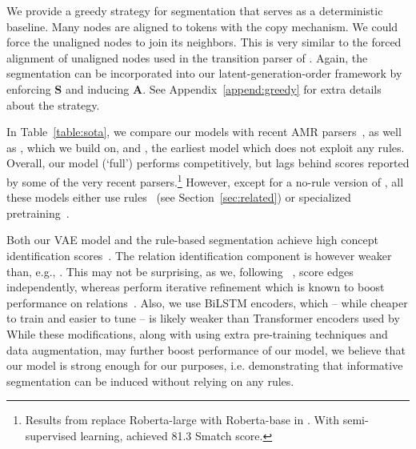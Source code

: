 \documentclass[11pt]{article}
\begin{document}
\vspace{1ex}
  \quad
We provide a greedy strategy for segmentation that serves as a deterministic baseline. Many nodes are aligned to tokens with the copy mechanism. We could force the unaligned nodes to join its neighbors. This is very similar to the forced alignment of unaligned nodes used in the transition parser of . Again, the segmentation can be  incorporated into our  latent-generation-order framework by enforcing $\mathbf{S}$ and inducing $\mathbf{A}$.
See Appendix~\ref{append:greedy} for extra details about the strategy.


\vspace{1ex}
   \quad
In Table~\ref{table:sota}, we compare our models with recent AMR parsers~\cite{xu-etal-2020-improving,Cai2020AMRPV,cai-lam-2019-core,Zhang2019AMRPA,Naseem2019RewardingST,Lindemann2020FastSP,Lee2020PushingTL}, as well as \cite{lyu-titov-2018-amr}, which we build on, and \cite{Noord2017NeuralSP}, the earliest model which does not exploit any rules.  Overall, our model (`full') performs competitively, but lags behind scores reported by some of the very recent parsers.\footnote{Results from \citeauthor{Lee2020PushingTL} replace Roberta-large with Roberta-base in \citeauthor{Astudillo2020TransitionbasedPW}. With semi-supervised learning,  achieved 81.3 Smatch score. } However, except for a no-rule version of , all these models either use rules~\cite{Lee2020PushingTL} (see Section~\ref{sec:related}) or specialized pretraining~\cite{xu-etal-2020-improving}. 

 
Both our VAE model and the rule-based segmentation achieve high concept identification scores~\cite{Damonte2017AnIP}.
The relation identification component is however weaker than, e.g., \cite{Cai2020AMRPV}. This may not be surprising, as  we, following ~, score edges independently, whereas \cite{Cai2020AMRPV} perform iterative refinement which is known to boost performance on relations~\cite{lyu-etal-2019-semantic}.  Also, we use BiLSTM encoders, which -- while cheaper to train and easier to tune --
is likely weaker than Transformer encoders used by \citeauthor{Astudillo2020TransitionbasedPW,Lee2020PushingTL} 
While these modifications, along with using extra pre-training techniques and data augmentation, may further boost performance of our model, we believe that our model is strong enough for our purposes, i.e. demonstrating that informative segmentation can be induced without relying on any rules.
\end{document}
